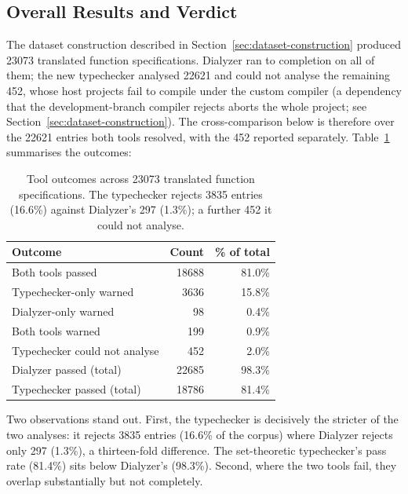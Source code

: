\subsection{Overall Results and Verdict}
\label{sec:overall-results}

The dataset construction described in Section~\ref{sec:dataset-construction} produced \num{23073} translated function specifications.
Dialyzer ran to completion on all of them; the new typechecker analysed \num{22621} and could not analyse the remaining 452, whose host projects fail to compile under the custom compiler (a dependency that the development-branch compiler rejects aborts the whole project; see Section~\ref{sec:dataset-construction}).
The cross-comparison below is therefore over the \num{22621} entries both tools resolved, with the 452 reported separately.
Table~\ref{tab:overall-results} summarises the outcomes:

\begin{table}[h]
    \centering
    \begin{tabular}{lrr}
        \toprule
        \textbf{Outcome} & \textbf{Count} & \textbf{\% of total} \\
        \midrule
        Both tools passed                   & \num{18688} & 81.0\% \\
        \midrule
        Typechecker-only warned             & \num{3636} & 15.8\% \\
        Dialyzer-only warned                &     98   &  0.4\% \\
        Both tools warned                   &    199   &  0.9\% \\
        \midrule
        Typechecker could not analyse       &    452   &  2.0\% \\
        \midrule
        Dialyzer passed (total)             & \num{22685} & 98.3\% \\
        Typechecker passed (total)          & \num{18786} & 81.4\% \\
        \bottomrule
    \end{tabular}
    \caption{Tool outcomes across \num{23073} translated function specifications. The typechecker rejects \num{3835} entries (16.6\%) against Dialyzer's 297 (1.3\%); a further 452 it could not analyse.}
    \label{tab:overall-results}
\end{table}

Two observations stand out.
First, the typechecker is decisively the stricter of the two analyses: it rejects \num{3835} entries (16.6\% of the corpus) where Dialyzer rejects only 297 (1.3\%), a thirteen-fold difference.
The set-theoretic typechecker's pass rate (81.4\%) sits below Dialyzer's (98.3\%).
Second, where the two tools fail, they overlap substantially but not completely.

